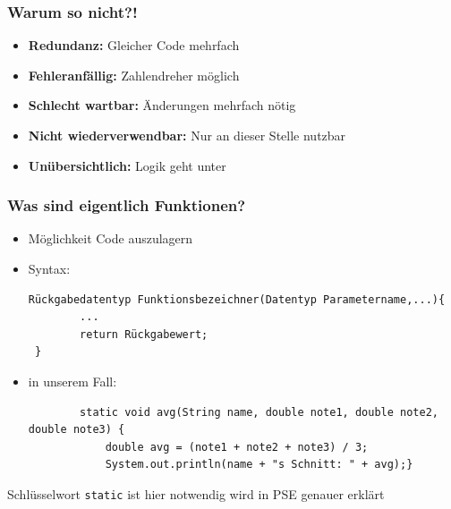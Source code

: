 \documentclass{../../presentation}
\begin{document}
\begin{frame}[fragile]
	\frametitle{Warum so nicht?!}
	\begin{itemize}
		\item\pause \textbf{Redundanz:} Gleicher Code mehrfach
		\item\pause \textbf{Fehleranfällig:} Zahlendreher möglich
		\item\pause \textbf{Schlecht wartbar:} Änderungen mehrfach nötig
		\item\pause \textbf{Nicht wiederverwendbar:} Nur an dieser Stelle nutzbar
		\item\pause \textbf{Unübersichtlich:} Logik geht unter
	\end{itemize}
	\vspace{2em}
	\begin{minipage}{\textwidth}
		\centering
		\onslide\pause{\Huge $\rightarrow$~}%
	\end{minipage}
\end{frame}

\begin{frame}[fragile]
	\frametitle{Was sind eigentlich Funktionen?}
	\begin{itemize}
		\item\pause  Möglichkeit Code auszulagern
		\item\pause Syntax:
		      \begin{verbatim}
Rückgabedatentyp Funktionsbezeichner(Datentyp Parametername,...){
        ...
        return Rückgabewert;
 }
        \end{verbatim}
		\item\pause in unserem Fall:
		      \begin{verbatim}
        static void avg(String name, double note1, double note2, double note3) {
            double avg = (note1 + note2 + note3) / 3;
            System.out.println(name + "s Schnitt: " + avg);}
            \end{verbatim}
	\end{itemize}
	Schlüsselwort \texttt{static} ist hier notwendig wird in PSE genauer erklärt
\end{frame}
\end{document}
